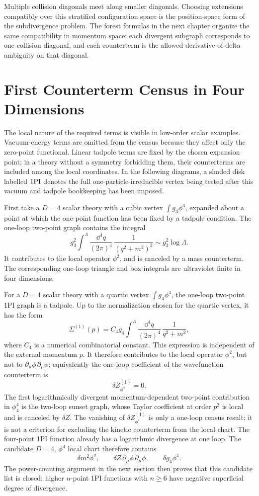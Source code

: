 Multiple collision diagonals meet along smaller diagonals.  Choosing
extensions compatibly over this stratified configuration space is the
position-space form of the subdivergence problem.  The forest formulas in the
next chapter organize the same compatibility in momentum space: each divergent
subgraph corresponds to one collision diagonal, and each counterterm is the
allowed derivative-of-delta ambiguity on that diagonal.

\section{First Counterterm Census in Four Dimensions}

The local nature of the required terms is visible in low-order scalar
examples.  Vacuum-energy terms are omitted from the census because they affect
only the zero-point functional.  Linear tadpole terms are fixed by the chosen
expansion point; in a theory without a symmetry forbidding them, their
counterterms are included among the local coordinates.  In the following
diagrams, a shaded disk labelled \(1{\rm PI}\) denotes the full
one-particle-irreducible vertex being tested after this vacuum and tadpole
bookkeeping has been imposed.

First take a \(D=4\) scalar theory with a cubic vertex
\(\int g_3\phi^3\), expanded about a point at which the one-point function has
been fixed by a tadpole condition.  The one-loop two-point graph contains the
integral
\[
  g_3^2
  \int^{\Lambda}
  \frac{\dd^4q}{(2\pi)^4}\,
  \frac{1}{(q^2+m^2)^2}
  \sim
  g_3^2\log\Lambda .
\]
It contributes to the local operator \(\phi^2\), and is canceled by a mass
counterterm.  The corresponding one-loop triangle and box integrals are
ultraviolet finite in four dimensions.

For a \(D=4\) scalar theory with a quartic vertex \(\int g_4\phi^4\), the
one-loop two-point 1PI graph is a tadpole.  Up to the normalization chosen for
the quartic vertex, it has the form
\[
  \Sigma^{(1)}(p)
  =
  C_4 g_4
  \int^\Lambda
  \frac{\dd^4q}{(2\pi)^4}\,
  \frac{1}{q^2+m^2},
\]
where \(C_4\) is a numerical combinatorial constant.  This expression is
independent of the external momentum \(p\).  It therefore contributes to the
local operator \(\phi^2\), but not to
\(\partial_\mu\phi\,\partial_\mu\phi\); equivalently the one-loop coefficient
of the wavefunction counterterm is
\[
  \delta Z^{(1)}_{\phi^4}=0 .
\]
The first logarithmically divergent momentum-dependent two-point contribution
in \(\phi^4_4\) is the two-loop sunset graph, whose Taylor coefficient at order
\(p^2\) is local and is canceled by \(\delta Z\).  The vanishing of
\(\delta Z^{(1)}_{\phi^4}\) is only a one-loop census result; it is not a
criterion for excluding the kinetic counterterm from the local chart.  The
four-point 1PI function already has a logarithmic divergence at one loop.  The
candidate \(D=4\), \(\phi^4\) local chart therefore contains
\[
  \delta m^2\phi^2,
  \qquad
  \delta Z\,\partial_{\mu}\phi\,\partial_{\mu}\phi,
  \qquad
  \delta g_4\phi^4 .
\]
The power-counting argument in the next section then proves that this candidate
list is closed: higher \(n\)-point 1PI functions with \(n\ge6\) have negative
superficial degree of divergence.

